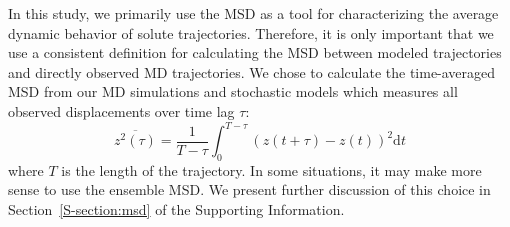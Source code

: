 \documentclass[journal=jctcce,manuscript=article]{achemso}
\begin{document}
  In this study, we primarily use the MSD as a tool for characterizing the average
  dynamic behavior of solute trajectories. Therefore, it is only important that we use a
  consistent definition for calculating the MSD between modeled trajectories and
  directly observed MD trajectories. We chose to calculate the time-averaged MSD from 
  our MD simulations and stochastic models which measures all observed displacements
  over time lag $\tau$: 
  \begin{equation}
  \overline{z^2(\tau)} = \dfrac{1}{T - \tau}\int_{0}^{T - \tau} (z(t + \tau) - z(t))^2 \mathrm{d}t
  \label{eqn:tamsd}
  \end{equation}
  where $T$ is the length of the trajectory. In some situations, it may make
  more sense to use the ensemble MSD. We present further discussion of this
  choice in Section~\ref{S-section:msd} of the Supporting Information.

\end{document}
